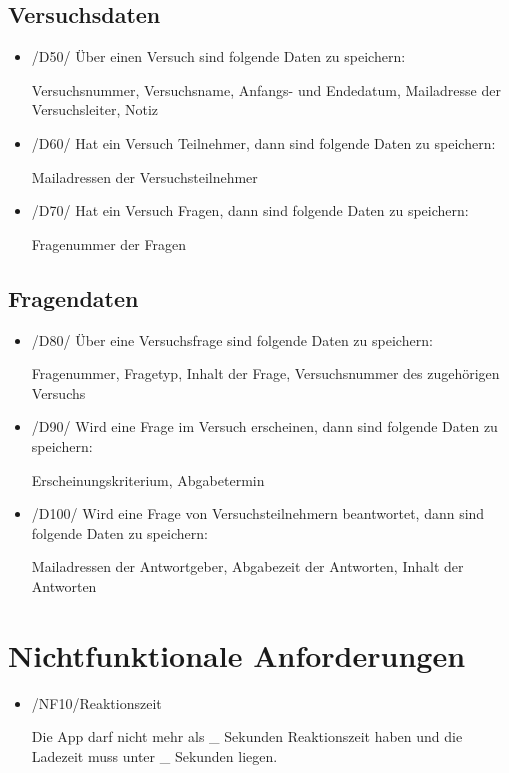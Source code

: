 \documentclass[a4paper]{scrreprt}
\begin{document}
        \section{Versuchsdaten}
            \begin{itemize}
                \item /D50/ Über einen Versuch sind folgende Daten zu speichern:
                    \par Versuchsnummer, Versuchsname, Anfangs- und Endedatum, Mailadresse der Versuchsleiter, Notiz
                    
                \item /D60/ Hat ein Versuch Teilnehmer, dann sind folgende Daten zu speichern:
                    \par Mailadressen der Versuchsteilnehmer
                    
                \item /D70/ Hat ein Versuch Fragen, dann sind folgende Daten zu speichern:
                    \par Fragenummer der Fragen
            \end{itemize}
            
        \section{Fragendaten}
            \begin{itemize}
                \item /D80/ Über eine Versuchsfrage sind folgende Daten zu speichern:
                    \par Fragenummer, Fragetyp, Inhalt der Frage, Versuchsnummer des zugehörigen Versuchs
                    
                \item /D90/ Wird eine Frage im Versuch erscheinen, dann sind folgende Daten zu speichern:
                    \par Erscheinungskriterium, Abgabetermin
                    
                \item /D100/ Wird eine Frage von Versuchsteilnehmern beantwortet, dann sind folgende Daten zu speichern:
                    \par Mailadressen der Antwortgeber, Abgabezeit der Antworten, Inhalt der Antworten
            \end{itemize}
 
   \chapter{Nichtfunktionale Anforderungen}
        \begin{itemize}
            \item /NF10/Reaktionszeit

            	\par Die App darf nicht mehr als \_ Sekunden Reaktionszeit haben und die Ladezeit muss unter \_ Sekunden liegen.

                
        \end{itemize}
 
\end{document}
